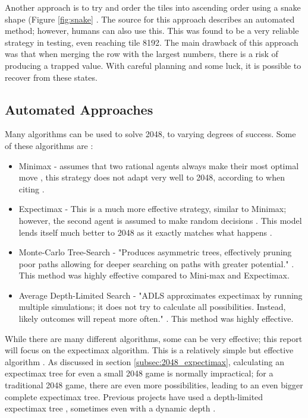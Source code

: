 \documentclass{article}
\begin{document}
Another approach is to try and order the tiles into ascending order using a snake shape (Figure \ref{fig:snake} \cite{aiplays2048}. The source for this approach describes an automated method; however,
humans can also use this. This was found to be a very reliable strategy in testing, even reaching tile 8192. The main drawback of this approach was that when merging the row with the largest numbers, there is a risk of producing a trapped value. With careful planning and some luck, it is possible to recover from these states.
\subsection{Automated Approaches}
\label{subsec:automated_techniques}
Many algorithms can be used to solve 2048, to varying degrees of success. Some of these algorithms are \cite{approches2048}:
\begin{itemize}
    \item Minimax - assumes that two rational agents always make their most optimal move \cite{minmaxCS2910}, this strategy does not adapt very well to 2048, according to \cite{approches2048} when citing \cite{minmax2048}.
    \item Expectimax - This is a much more effective strategy, similar to Minimax; however, the second agent is assumed to make random decisions \cite[p.~200]{russell2010artificial}. This model lends itself much better to 2048 as it exactly matches what happens \cite{expectimax2048}.
    \item Monte-Carlo Tree-Search - "Produces asymmetric trees, effectively pruning poor paths allowing for deeper searching on paths with greater potential." \cite{approches2048}. This method was highly effective compared to Mini-max and Expectimax.
    \item Average Depth-Limited Search - "ADLS approximates expectimax by running multiple simulations; it does not try to calculate all possibilities. Instead, likely outcomes will repeat more often." \cite {approches2048}. This method was highly effective.
\end{itemize}
While there are many different algorithms, some can be very effective; this report will focus on the expectimax algorithm. This is a relatively simple but effective algorithm \cite{expectimax2048}. As discussed in section \ref{subsec:2048_expectimax}, calculating an expectimax tree for even a small 2048 game is normally impractical; for a traditional 2048 game, there are even more possibilities, leading to an even bigger complete expectimax tree. Previous projects have used a depth-limited expectimax tree \cite{aiplays2048}, sometimes even with a dynamic depth \cite{expectimax2048}.
\end{document}
